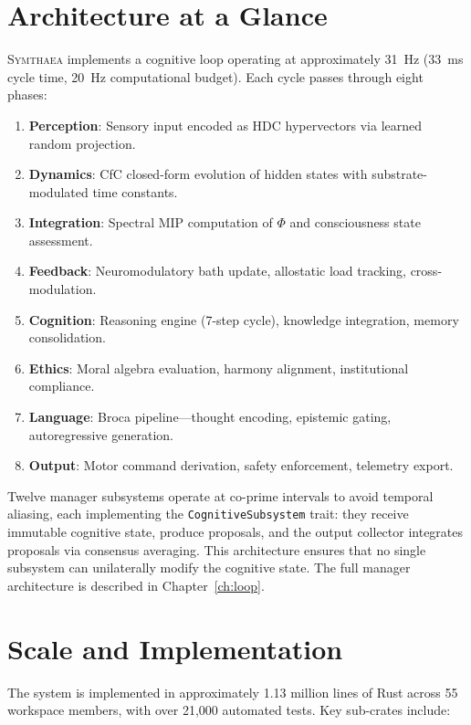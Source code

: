 \documentclass[12pt]{book}
\newcommand{\symthaea}{\textsc{Symthaea}}
\begin{document}
\section{Architecture at a Glance}

\symthaea{} implements a cognitive loop operating at approximately 31~Hz (33~ms cycle time, 20~Hz computational budget). Each cycle passes through eight phases:

\begin{enumerate}
  \item \textbf{Perception}: Sensory input encoded as HDC hypervectors via learned random projection.
  \item \textbf{Dynamics}: CfC closed-form evolution of hidden states with substrate-modulated time constants.
  \item \textbf{Integration}: Spectral MIP computation of $\Phi$ and consciousness state assessment.
  \item \textbf{Feedback}: Neuromodulatory bath update, allostatic load tracking, cross-modulation.
  \item \textbf{Cognition}: Reasoning engine (7-step cycle), knowledge integration, memory consolidation.
  \item \textbf{Ethics}: Moral algebra evaluation, harmony alignment, institutional compliance.
  \item \textbf{Language}: Broca pipeline---thought encoding, epistemic gating, autoregressive generation.
  \item \textbf{Output}: Motor command derivation, safety enforcement, telemetry export.
\end{enumerate}

Twelve manager subsystems operate at co-prime intervals to avoid temporal aliasing, each implementing the \texttt{CognitiveSubsystem} trait: they receive immutable cognitive state, produce proposals, and the output collector integrates proposals via consensus averaging. This architecture ensures that no single subsystem can unilaterally modify the cognitive state. The full manager architecture is described in Chapter~\ref{ch:loop}.

\section{Scale and Implementation}

The system is implemented in approximately 1.13 million lines of Rust across 55 workspace members, with over 21,000 automated tests. Key sub-crates include:
\end{document}
